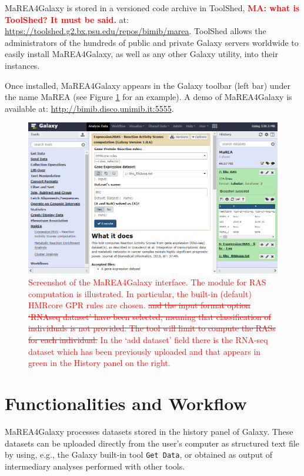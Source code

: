 \documentclass[preprint,12pt,authoryear]{elsarticle}
\newcommand{\red}{\textcolor{red}}
\newcommand{\mareagalaxy}{\textsf{MaREA4Galaxy}}
\newcommand{\mareaTool}{\textsf{MaREA}}
\begin{document}
\mareagalaxy{} is stored in a versioned code archive in ToolShed,
\red{\bfseries MA: what is ToolShed?  It must be said.} at:\\
\url{https://toolshed.g2.bx.psu.edu/repos/bimib/marea}.  ToolShed
allows the administrators of the hundreds of public and private Galaxy
servers worldwide to easily install \mareagalaxy, as well as any other
Galaxy utility, into their instances.

Once installed, \mareagalaxy{} appears in the Galaxy toolbar (left bar)
under the name \mareaTool{} (see Figure \ref{fig:screenshot1} for an
example).  A demo of \mareagalaxy{} is available at:
\url{http://bimib.disco.unimib.it:5555}.

\begin{figure}[ht]
  \includegraphics[width=1\textwidth]{figs/screenshot1v2q.png}
  \caption{\red{Screenshot of the \mareagalaxy{} interface. The module
      for RAS computation is illustrated. In particular, the built-in
      (default) HMRcore GPR rules are chosen. \sout{and the input
        format option `RNAseq dataset' have been selected, meaning
        that classification of individuals is not provided. The tool
        will limit to compute the RASs for each individual.} In the
      `add dataset' field there is the RNA-seq dataset which has been
      previously uploaded and that appears in green in the History
      panel on the right.}}
  \label{fig:screenshot1}
\end{figure}

 
\section{Functionalities and Workflow}

\mareagalaxy{} processes datasets stored in the history panel of
Galaxy. These datasets can be uploaded directly from the user's
computer as structured text file by using, e.g., the Galaxy built-in
tool \texttt{Get Data}, or obtained as output of intermediary analyses
performed with other tools.
 
\end{document}
